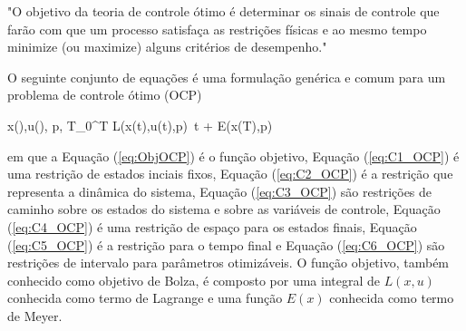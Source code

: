 "O objetivo da teoria de controle ótimo é determinar os sinais de controle que farão com que um processo satisfaça as restrições físicas e ao mesmo
tempo minimize
(ou maximize) alguns critérios de desempenho."\cite{book:Kirk}

O seguinte conjunto de equações é uma formulação genérica e comum para um problema de controle ótimo (OCP)


\begin{mini!}
	{x(\cdot),u(\cdot), p, T}{\int_{0}^{T} L(x(t),u(t),p) \,t \;+\; E(x(T),p) \label{eq:ObjOCP}}
	{\label{eq:formulacaoOCP}}{}
\end{mini!}

em que a Equação (\ref{eq:ObjOCP}) é o função objetivo, Equação (\ref{eq:C1_OCP}) é uma restrição de estados inciais fixos, Equação (\ref{eq:C2_OCP}) é
a restrição
que representa a dinâmica
do sistema, Equação (\ref{eq:C3_OCP}) são restrições de caminho sobre os estados do sistema e sobre as variáveis de controle, Equação (\ref{eq:C4_OCP})
é uma restrição de espaço para os estados finais, Equação (\ref{eq:C5_OCP}) é a restrição para o tempo final e Equação (\ref{eq:C6_OCP}) são restrições de intervalo para parâmetros otimizáveis.
O função objetivo, também conhecido como objetivo de Bolza, é composto por uma integral de $L(x,u)$ conhecida como termo de Lagrange
e uma função $E(x)$ conhecida como termo de Meyer\cite{book:Numerical_Optimal_Control}.

